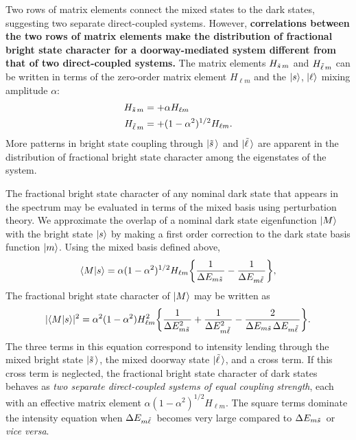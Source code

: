 Two rows of matrix elements connect the mixed states to the dark
states, suggesting two separate direct-coupled systems. However,
\textbf{correlations between the two rows of matrix elements make the
  distribution of fractional bright state character for a
  doorway-mediated system different from that of two direct-coupled
  systems.}  The matrix elements $H_{\tilde{s}\, m}$ and $H_{\tilde{\ell}\, m}$ can be
written in terms of the zero-order matrix element $H_{\ell m}$ and the
$\mathinner{|{s}\rangle}$, $\mathinner{|{\ell}\rangle}$ mixing amplitude $\alpha$:
\begin{equation}
  \begin{split}
    H_{\tilde{s}\, m} &= + \alpha H_{\ell m}\\
    H_{\tilde{\ell}\, m} &= + (1-\alpha^2)^{1/2} H_{\ell m}.
  \end{split}
\end{equation}
More patterns in bright state coupling through $\mathinner{|{\tilde{s}\,}\rangle}$ and
$\mathinner{|{\tilde{\ell}\,}\rangle}$ are apparent in the distribution of fractional
bright state character among the eigenstates of the system.

The fractional bright state character of any nominal dark state that
appears in the spectrum may be evaluated in terms of the mixed basis
using perturbation theory. We approximate the overlap of a nominal
dark state eigenfunction $\mathinner{|{M}\rangle}$ with the bright state $\mathinner{|{s}\rangle}$ by
making a first order correction to the dark state basis function
$\mathinner{|{m}\rangle}$.  Using the mixed basis defined above,
\begin{equation}
  \label{eq:mixed-basis-overlap}
  \mathinner{\langle{M|s}\rangle} = \alpha (1 - \alpha^2)^{1/2} H_{\ell m}
  \biggl \lbrace
    \frac{1}{\Delta E_{m \tilde{s}\,}} - \frac{1}{\Delta E_{m \tilde{\ell}\,}}
  \biggr \rbrace,
\end{equation}
The fractional bright state character of $\mathinner{|{M}\rangle}$ may be written as
\begin{equation}
  \label{eq:mixed-basis-int}
  \lvert \mathinner{\langle{M|s}\rangle} \rvert^2 = 
  \alpha^2 (1-\alpha^2) H_{\ell m}^2 
   \biggl \lbrace 
   \frac{1}{\Delta E_{m \tilde{s}\,}^2} +\frac{1}{\Delta E_{m \tilde{\ell}\,}^2} 
   - \frac{2}{\Delta E_{m \tilde{s}\,} \Delta E_{m \tilde{\ell}\,}}
   \biggr \rbrace.
\end{equation}
The three terms in this equation correspond to intensity lending
through the mixed bright state $\mathinner{|{\tilde{s}\,}\rangle}$, the mixed doorway state
$\mathinner{|{\tilde{\ell}\,}\rangle}$, and a cross term.  If this cross term is neglected, the
fractional bright state character of dark states behaves as \emph{two
  separate direct-coupled systems of equal coupling strength}, each
with an effective matrix element $\alpha (1-\alpha^2)^{1/2} H_{\ell
  m}$. The square terms dominate the intensity equation when $\Delta
E_{m \tilde{\ell}\,}$ becomes very large compared to $\Delta E_{m \tilde{s}\,}$ or
\emph{vice versa}.

